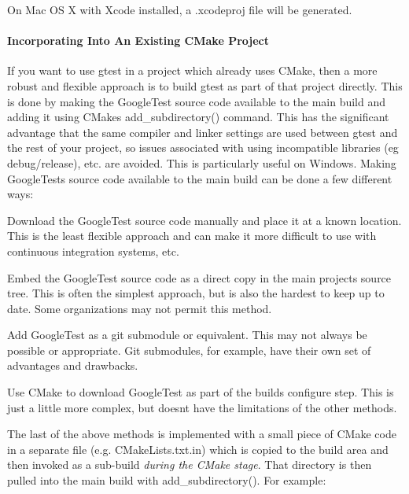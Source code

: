 On Mac OS X with Xcode installed, a {\ttfamily .xcodeproj} file will be generated.

\paragraph*{Incorporating Into An Existing C\+Make Project}

If you want to use gtest in a project which already uses C\+Make, then a more robust and flexible approach is to build gtest as part of that project directly. This is done by making the Google\+Test source code available to the main build and adding it using C\+Make\textquotesingle{}s {\ttfamily add\+\_\+subdirectory()} command. This has the significant advantage that the same compiler and linker settings are used between gtest and the rest of your project, so issues associated with using incompatible libraries (eg debug/release), etc. are avoided. This is particularly useful on Windows. Making Google\+Test\textquotesingle{}s source code available to the main build can be done a few different ways\+:


\begin{DoxyItemize}
\item Download the Google\+Test source code manually and place it at a known location. This is the least flexible approach and can make it more difficult to use with continuous integration systems, etc.
\item Embed the Google\+Test source code as a direct copy in the main project\textquotesingle{}s source tree. This is often the simplest approach, but is also the hardest to keep up to date. Some organizations may not permit this method.
\item Add Google\+Test as a git submodule or equivalent. This may not always be possible or appropriate. Git submodules, for example, have their own set of advantages and drawbacks.
\item Use C\+Make to download Google\+Test as part of the build\textquotesingle{}s configure step. This is just a little more complex, but doesn\textquotesingle{}t have the limitations of the other methods.
\end{DoxyItemize}

The last of the above methods is implemented with a small piece of C\+Make code in a separate file (e.\+g. {\ttfamily C\+Make\+Lists.\+txt.\+in}) which is copied to the build area and then invoked as a sub-\/build {\itshape during the C\+Make stage}. That directory is then pulled into the main build with {\ttfamily add\+\_\+subdirectory()}. For example\+:


